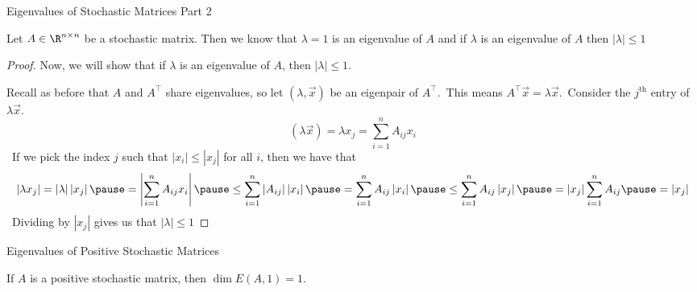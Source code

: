 \documentclass[xcoler=dvipsnames, aspectratio=169]{beamer}
\newcommand{\abs}[1]{\left|#1\right|}
\begin{document}
    \begin{frame}{Eigenvalues of Stochastic Matrices Part 2}
        \footnotesize
        \begin{theorem}
            Let $A\in\R^{n\times n}$ be a stochastic matrix. Then we know that $\lambda=1$ is an
            eigenvalue of $A$ and if $\lambda$ is an eigenvalue of $A$ then $\abs{\lambda}\leq 1$
        \end{theorem}\pause
        \begin{proof}
            Now, we will show that if $\lambda$ is an eigenvalue of $A$, then $\abs{\lambda}\leq 1$.\pause

            Recall as before that $A$ and $A^\top$ share eigenvalues, so let $(\lambda,\vec{x})$
            be an eigenpair of $A^\top$.\pause\ This means $A^\top\vec{x} = \lambda\vec{x}$.\pause\
            Consider the $j^\text{th}$ entry of $\lambda\vec{x}$.
            \vspace{-5pt}
            \[
                (\lambda\vec{x}) = \lambda x_j = \sum_{i=1}^n A_{ij}x_i
            \]\pause\
            If we pick the index $j$ such that $\abs{x_i}\leq\abs{x_j}$ for all $i$,
            then we have that\pause\
            \[
                \abs{\lambda x_j} = \abs{\lambda}\abs{x_j}\pause = \abs{\sum_{i=1}^n A_{ij}x_i}
                \pause\leq \sum_{i=1}^n\abs{A_{ij}}\abs{x_i}\pause = \sum_{i=1}^nA_{ij}\abs{x_i}
                \pause\leq \sum_{i=1}^nA_{ij}\abs{x_j}\pause = \abs{x_j}\sum_{i=1}^nA_{ij}\pause =
                \abs{x_j}
            \]\pause\
            Dividing by $\abs{x_j}$ gives us that $\abs{\lambda}\leq 1$
        \end{proof}
    \end{frame}
    \begin{frame}{Eigenvalues of Positive Stochastic Matrices}
        \begin{theorem}
            If $A$ is a positive stochastic matrix, then $\dim{E(A,1)} = 1$.
        \end{theorem}
        \vspace{130pt}
    \end{frame}
\end{document}
